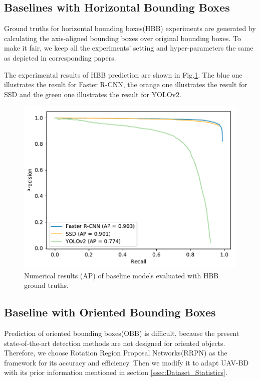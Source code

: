 \subsection{Baselines with Horizontal Bounding Boxes}

Ground truths for horizontal bounding boxes(HBB) experiments are generated by calculating the axis-aligned bounding boxes over original bounding boxes. To make it fair, we keep all the experiments' setting and hyper-parameters the same as depicted in corresponding papers\cite{FasterRCNN, SSD, YOLOv2}.

The experimental results of HBB prediction are shown in Fig.\ref{fig:pr_bbox}. The blue one illustrates the result for Faster R-CNN, the orange one illustrates the result for SSD and the green one illustrates the result for YOLOv2.


\begin{figure}
	\includegraphics[width=\linewidth]{images/pr_bbox.pdf}
	\caption{Numerical results (AP) of baseline models evaluated with HBB ground truths.}
	\label{fig:pr_bbox}
\end{figure}

\subsection{Baseline with Oriented Bounding Boxes}

Prediction of oriented bounding boxes(OBB) is difficult, because the present state-of-the-art detection methods are not designed for oriented objects. Therefore, we choose Rotation Region Proposal Networks(RRPN)\cite{RRPN} as the framework for its accuracy and efficiency. Then we modify it to adapt UAV-BD with its prior information mentioned in section \ref{ssec:Dataset_Statistics}.

